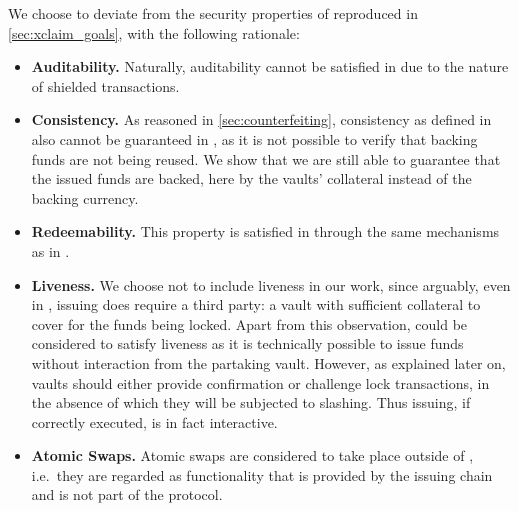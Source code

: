 We choose to deviate from the security properties of \xclaim reproduced in \cref{sec:xclaim_goals}, with the following rationale:
\begin{itemize}
    \item \textbf{Auditability.} Naturally, auditability cannot be satisfied in \zclaim due to the nature of shielded transactions.
    
    \item \textbf{Consistency.} As reasoned in \cref{sec:counterfeiting}, consistency as defined in \xclaim also cannot be guaranteed in \zclaim, as it is not possible to verify that backing funds are not being reused.
    We show that we are still able to guarantee that the issued funds are backed, here by the vaults' collateral instead of the backing currency.
    
    \item \textbf{Redeemability.} This property is satisfied in \zclaim through the same mechanisms as in \xclaim.
    
    \item \textbf{Liveness.} We choose not to include liveness in our work, since arguably, even in \xclaim, issuing does require a third party: a vault with sufficient collateral to cover for the funds being locked.
    Apart from this observation, \zclaim could be considered to satisfy liveness as it is technically possible to issue funds without interaction from the partaking vault.
    However, as explained later on, vaults should either provide confirmation or challenge lock transactions, in the absence of which they will be subjected to slashing.
    Thus issuing, if correctly executed, is in fact interactive.
    
    \item \textbf{Atomic Swaps.} Atomic swaps are considered to take place outside of \zclaim, i.e.\ they are regarded as functionality that is provided by the issuing chain and is not part of the \zclaim protocol.
\end{itemize}

